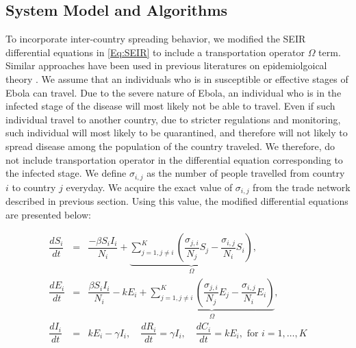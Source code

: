 \documentclass[10pt, journal,onecolumn]{IEEEtran}
\begin{document}
\subsection{{System Model and Algorithms}}
\label{SubSec:WorldSystem}

To incorporate inter-country spreading behavior, we modified the SEIR differential equations in
\eqref{Eq:SEIR} to include a transportation operator $\Omega$ term. Similar approaches have been
used in previous literatures on epidemiolgoical theory \citep{grais2003assessing,
balcan2010modeling}. We assume that an individuals who is in susceptible or effective stages of
Ebola can travel. Due to the severe nature of Ebola, an individual who is in the infected stage of
the disease will most likely not be able to travel. Even if such individual travel to another
country, due to stricter regulations and monitoring, such individual will most likely to be
quarantined, and therefore will not likely to spread disease among the population of the country
traveled. We therefore, do not  include transportation operator in the differential equation
corresponding to the infected stage. We define $\sigma_{i,j}$ as the number of people travelled from
country $i$ to country $j$ everyday. We acquire the exact value of  $\sigma_{i,j}$ from the trade
network described in previous section.  Using this value, the modified differential equations are
presented below:

\begin{eqnarray}
\dfrac{dS_{i}}{dt}&=&\dfrac{-\beta S_{i}I_{i}}{N_{i}}+\underset{\Omega}{\underbrace{\sum_{j=1,j\neq i}^{K}\left(\dfrac{\sigma_{j,i}}{N_{j}}S_{j}-\dfrac{\sigma_{i,j}}{N_{i}}S_{i}\right)}},\nonumber \\
\dfrac{dE_{i}}{dt}&=&\dfrac{\beta S_{i}I_{i}}{N_{i}}-kE_{i}+\underset{\Omega}{\underbrace{\sum_{j=1,j\neq i}^{K}\left(\dfrac{\sigma_{j,i}}{N_{j}}E_{j}-\dfrac{\sigma_{i,j}}{N_{i}}E_{i}\right)}},\nonumber \\
\dfrac{dI_{i}}{dt}&=& kE_{i}-\gamma I_{i},
\quad
\dfrac{dR_i}{dt}	=	\gamma I_i,
\quad
\dfrac{dC_i}{dt}	=	kE_i, \text{  for } i=1,\ldots, K
\label{Eq:SEIR_world}
\end{eqnarray}
\end{document}
